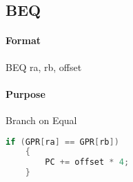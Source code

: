 \subsection{BEQ}


\paragraph{Format} BEQ ra, rb, offset

\paragraph{Purpose} Branch on Equal

\begin{lstlisting}[language=c]
    if (GPR[ra] == GPR[rb])
    {
        PC += offset * 4;
    }
\end{lstlisting}
